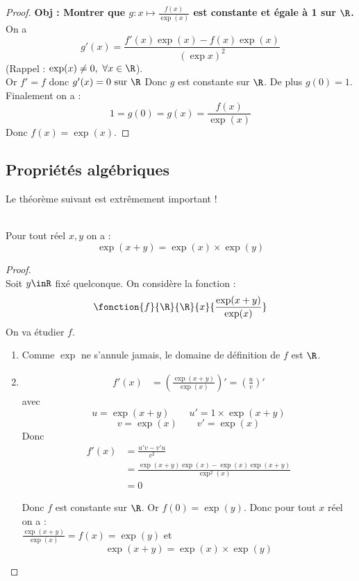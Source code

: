 \documentclass[12pt,fleqn]{report} %
\begin{document}
\begin{proof}
	\textbf{Obj : Montrer que $g : x \mapsto \frac{f(x)}{\exp(x)}$ est constante et égale à 1 sur $\R$.}\\
	
	On a 
	\[
	g'(x) = \frac{f'(x)\exp(x) - f(x)\exp(x)}{(\exp x)^2} 
	\] 
	(Rappel : $\exp (x) \neq 0,\ \forall x \in \R$). \\
	
	
	Or $f'=f$ donc $g'(x) = 0 \text{ sur } \R$
	Donc $g$ est constante sur $\R$. De plus $g(0)=1$. \\
	Finalement on a :
	\[
	1 = g(0) = g(x) = \frac{f(x)}{\exp(x)}
	\]
	Donc $f(x) = \exp(x)$.
\end{proof}


\subsection{Propriétés algébriques}
Le théorème suivant est extrêmement important !
\begin{theorem}\label{Thm exp morphisme}\text{ }\\
	Pour tout réel $x,y$ on a :\[
	\exp (x + y) = \exp(x) \times \exp(y)
	\]
\end{theorem}
\begin{proof}\text{ }\\
	Soit $y\inR$ fixé quelconque. On considère la fonction : \[\fonction{f}{\R}{\R}{x}{\frac{\exp({x+y})}{\exp(x)}}\]
	On va étudier $f$. \begin{enumerate}
		\item Comme $\exp$ ne s'annule jamais, le domaine de définition de $f$ est $\R$.
		\item \begin{align*}
		f'(x) & = \left(\frac{\exp({x+y})}{\exp(x)}\right)'  = \left(\frac{u}{v}\right)'
		\end{align*}
		avec \[
		u = \exp({x+y})  \qquad u' = 1 \times \exp({x+y}) \]\[
		v = \exp({x}) \qquad v' = \exp(x)
		\]
		Donc \begin{align*}
		f'(x) & = \frac{u'v - v'u}{v^2}  \\
		& = \frac{\exp({x+y}) \exp({x}) - \exp(x) \exp({x+y})}{\exp^2(x)}\\
		& = 0
		\end{align*}
		
		Donc $f$ est constante sur $\R$. Or $f(0) = \exp(y)$. Donc pour tout $x$ réel on a : \\ $\frac{\exp(x+y)}{\exp(x)} = f(x) = \exp(y)$ et  
		\[
		\exp(x+y) = \exp(x)\times \exp(y)
		\]
	\end{enumerate}
\end{proof}
\end{document}
